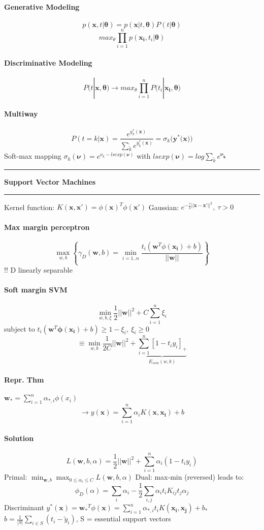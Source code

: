 \documentclass[7pt]{scrartcl}
\newlength{\secskip}
\renewcommand{\section}[1]{
  \vspace{\secskip}
  \hrule\vspace{.3em}
  \textbf{#1}
  \vspace{.3em}
  \hrule
  \vspace{\secskip}
}
\renewcommand{\vec}{\mathbf}
\begin{document}
\begin{multicols}{4}
\paragraph{Generative Modeling}
\[p(\vec{x},t|\vec{\theta}) = p(\vec{x}|t,\vec{\theta})P(t|\vec{\theta}) \]
\[max_{\theta} \prod_{i=1}^n p(\vec{x_i},t_i|\vec{\theta})\]
\paragraph{Discriminative Modeling}
\[P(t|\vec{x,\theta}) \rightarrow max_\theta \prod_{i=1}^n P(t_i|\vec{x_i,\theta)}\]
\paragraph{Multiway}
\[P(t=k|\vec{x}) = \frac{e^{y_k^*(\vec{x})}}{\sum_{\tilde{k}}e^{y_{\tilde{k}}^*(\vec{x})}} = \sigma_k(\vec{y}^*(\vec{x))}\]
Soft-max mapping $\sigma_k(\vec{\nu}) = e^{\nu_k - lsexp(\vec{\nu})}$ with $lsexp(\vec{\nu}) = log \sum_{\tilde{k}}e^{\vec{\nu_{\tilde{k}}}}$

\section{Support Vector Machines}
Kernel function: $K(\vec x, \vec x') = \phi(\vec x)^T\phi(\vec x')$
Gaussian: $e^{-\frac{\tau}{2}||\vec{x}-\vec{x'}||^2}, ~ \tau >0$
\paragraph{Max margin perceptron}
\[\max_{w,b} \left\{ \gamma_D(\vec{w},b) = \min_{i=1..n} \frac{t_i(\vec{w}^T \phi(\vec{x_i}) + b)}{||\vec{w}||} \right\}\]
!! D linearly separable
\paragraph{Soft margin SVM}
\[\min_{w,b,\xi} \frac{1}{2}||\vec{w}||^2 + C \sum_{i=1}^n \xi_i\]
subject to $t_i(\vec{w}^T \vec{\phi(x_i)} + b) \geq 1-\xi_i,~ \xi_i \geq 0$
\[\equiv \min_{w,b} \frac{1}{2C}||\vec{w}||^2 + \underbrace{\sum_{i=1}^n [1-t_iy_i]_+}_{E_{svm}(w,b)}\]
\paragraph{Repr. Thm}
$\vec{w_*} = \sum_{i=1}^n \alpha_{*,i} \phi(x_i)$
\[\rightarrow y(\vec{x}) = \sum_{i=1}^n \alpha_i K(\vec{x},\vec{x_i})+b\]
\paragraph{Solution}
\[L(\vec{w},b,\alpha) = \frac{1}{2}||\vec{w}||^2 + \sum_{i=1}^n \alpha_i(1-t_iy_i)\]
Primal: $\min_{\vec{w},b} \max_{0 \leq \alpha_i \leq C} L(\vec{w},b,\alpha)$
Dual: max-min (reversed) leads to:
\[\phi_D(\alpha) = \sum_i \alpha_i - \frac{1}{2} \sum_{i,j} \alpha_i t_i K_{ij} t_j \alpha_j\]
Discriminant $y^*(\vec{x}) = \vec{w_*}^T \phi(\vec{x}) = \sum_{i=1}^n \alpha_{*,i} t_i K(\vec{x_i},\vec{x_j}) + b_*$\\
$b = \frac{1}{|S|} \sum_{i \in S} (t_i - \tilde{y}_i)$, S = essential support vectors

\end{multicols}
\end{document}
